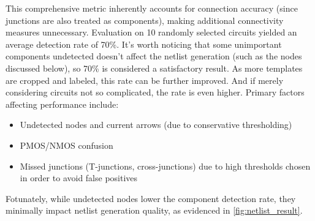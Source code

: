 \documentclass{article}
\begin{document}
This comprehensive metric inherently accounts for connection accuracy (since junctions are also treated as components), making additional connectivity measures unnecessary. 
Evaluation on 10 randomly selected circuits yielded an average detection rate of 70\%. 
It's worth noticing that some unimportant components undetected doesn't affect the netlist generation (such as the nodes discussed below),
so 70\% is considered a satisfactory result. As more templates are cropped and labeled, this rate can be further improved. 
And if merely considering circuits not so complicated, the rate is even higher.
Primary factors affecting performance include:
\begin{itemize}
\item Undetected nodes and current arrows (due to conservative thresholding)
\item PMOS/NMOS confusion
\item Missed junctions (T-junctions, cross-junctions) due to high thresholds chosen in order to avoid false positives
\end{itemize}
Fotunately, while undetected nodes lower the component detection rate, 
they minimally impact netlist generation quality, as evidenced in \cref{fig:netlist_result}.
\end{document}
